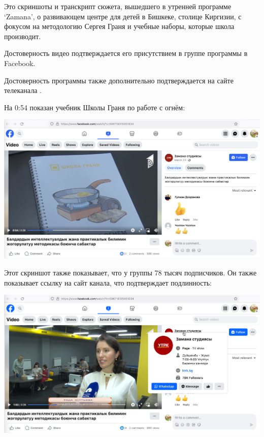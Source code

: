 
Это скриншоты и транскрипт сюжета, вышедшего в утренней программе `Zamana',
о развивающем центре для детей в Бишкеке, столице Киргизии,
с фокусом на методологию Сергея Граня и учебные наборы,
которые школа производит.

Достоверность видео подтверждается его присутствием в группе программы в Facebook.

Достоверность программы также дополнительно подтверждается на сайте телеканала .

На 0:54 показан учебник Школы Граня по работе с огнём:

\includegraphics[width=\textwidth]{0_54_book-fire}



Этот скриншот также показывает, что у группы 78 тысяч подписчиков.
Он также показывает ссылку на сайт канала, что подтверждает подлинность:

\includegraphics[width=\textwidth]{1_02_rada-stats}

